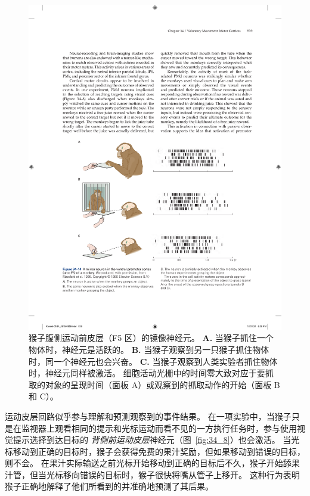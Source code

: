 \begin{figure}[htbp]
	\centering
	\includegraphics[width=0.95\linewidth]{chap34/fig_34_14}
	\caption{猴子腹侧运动前皮层（F5 区）的镜像神经元\cite{rizzolatti1996premotor}。
		\textbf{A.} 当猴子抓住一个物体时，神经元是活跃的。
		\textbf{B.} 当猴子观察到另一只猴子抓住物体时，同一个神经元也会兴奋。
		\textbf{C.} 当猴子观察到人类实验者抓住物体时，神经元同样被激活。
		细胞活动光栅中的时间零大致对应于要抓取的对象的呈现时间（面板 A）或观察到的抓取动作的开始（面板 B 和 C）。}
	\label{fig:34_14}
\end{figure}


运动皮层回路似乎参与理解和预测观察到的事件结果。
在一项实验中，当猴子只是在监视器上观看相同的提示和光标运动而看不见的一方执行任务时，参与使用视觉提示选择到达目标的 \textit{背侧前运动皮层}神经元（图~\ref{fig:34_8}）也会激活。
当光标移动到正确的目标时，猴子会获得免费的果汁奖励，但如果移动到错误的目标，则不会。
在果汁实际输送之前光标开始移动到正确的目标后不久，猴子开始舔果汁管，但当光标移向错误的目标时，猴子很快将嘴从管子上移开。
这种行为表明猴子正确地解释了他们所看到的并准确地预测了其后果。


